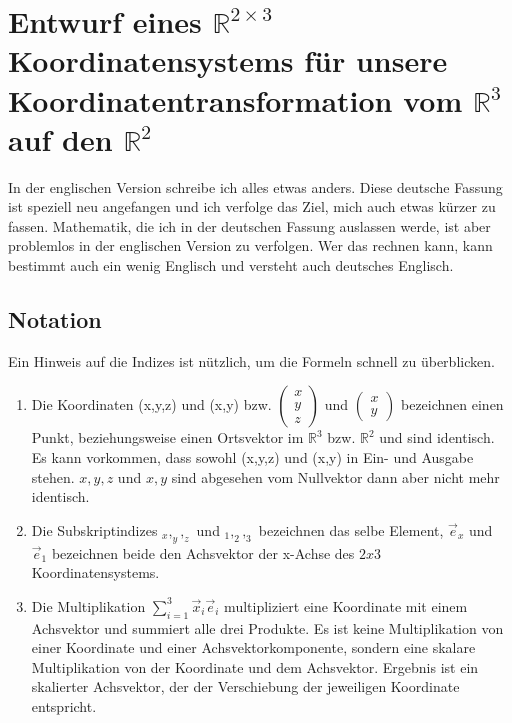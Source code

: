 \documentclass[a4paper]{article}
\begin{document}

\section{Entwurf eines $\mathbb{R}^{2\times{3}}$ Koordinatensystems f\"ur unsere Koordinatentransformation vom $\mathbb{R}^{3}$ auf den $\mathbb{R}^{2}$}

In der englischen Version schreibe ich alles etwas anders. Diese deutsche Fassung ist speziell neu angefangen und ich verfolge das
Ziel, mich auch etwas k\"urzer zu fassen. Mathematik, die ich in der deutschen Fassung auslassen werde, ist aber problemlos in der
englischen Version zu verfolgen. Wer das rechnen kann, kann bestimmt auch ein wenig Englisch und versteht auch deutsches Englisch.\\

\subsection{Notation}

Ein Hinweis auf die Indizes ist n\"utzlich, um die Formeln schnell zu \"uberblicken.\\

\begin{enumerate}

\item Die Koordinaten (x,y,z) und (x,y) bzw. $\begin{pmatrix}x\\y\\z\end{pmatrix}$ und $\begin{pmatrix}x\\y\end{pmatrix}$ bezeichnen einen Punkt, beziehungsweise einen Ortsvektor im $\mathbb{R}^{3}$ bzw. $\mathbb{R}^{2}$ und sind identisch. Es kann vorkommen, dass sowohl (x,y,z) und (x,y) in Ein- und Ausgabe stehen. $x,y,z$ und $x,y$ sind abgesehen vom Nullvektor dann aber nicht mehr identisch.

\item Die Subskriptindizes $_x,_y,_z$ und $_1,_2,_3$ bezeichnen das selbe Element, $\vec{e}_x$ und $\vec{e}_1$ bezeichnen beide den Achsvektor der x-Achse des $2x3$ Koordinatensystems.

\item Die Multiplikation $\sum_{i=1}^{3}\vec{x}_{i}\vec{e}_{i}$ multipliziert eine Koordinate mit einem Achsvektor und summiert alle drei Produkte. Es ist keine Multiplikation von einer Koordinate und einer Achsvektorkomponente, sondern eine skalare Multiplikation von der Koordinate und dem Achsvektor. Ergebnis ist ein skalierter Achsvektor, der der Verschiebung der jeweiligen Koordinate entspricht.

\end{enumerate}
\end{document}
